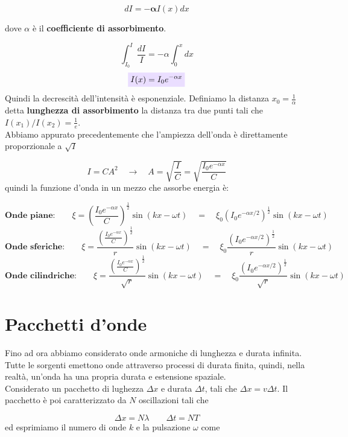 \documentclass[x11names]{report}
\newcommand{\viola}[1]{\colorbox{yred}{$\displaystyle #1$}}
\begin{document}
	\[ 
	dI = -\boldsymbol{\alpha} I(x)dx
	\]
	
	dove \(\alpha\) è il \textbf{coefficiente di assorbimento}.
	
	\[ 
	\int_{I_0}^{I} \frac{dI}{I} = -\alpha\int_{0}^{x} dx 
	\]
	\begin{equation}
		\viola{I(x) = I_0e^{-\alpha x}}
	\end{equation}
	Quindi la decrescità dell'intensità è esponenziale. Definiamo la distanza \(x_0 = \frac{1}{\alpha}\) detta \textbf{lunghezza di assorbimento} la distanza tra due punti tali che \(I(x_1)/I(x_2) = \frac{1}{e}\).\\
	
	\noindent
	Abbiamo appurato precedentemente che l'ampiezza dell'onda è direttamente proporzionale a \(\sqrt{I}\)
	
	\[ 
	I = CA^2 \quad \to \quad A = \sqrt{\frac{I}{C}} = \sqrt{\frac{I_0e^{-\alpha x}}{C}}
	\]
	quindi la funzione d'onda in un mezzo che assorbe energia è:
	
	\[ 
	\textbf{Onde piane:}\qquad \xi = \left(\frac{I_0e^{-\alpha x}}{C}\right)^{\frac{1}{2}} \sin\left(kx-\omega t\right) \quad = \quad \xi_0 \left(I_0e^{-\alpha x/2}\right)^{\frac{1}{2}}\sin\left(kx-\omega t\right)
	\]
	\[ 
	\textbf{Onde sferiche:}\qquad \xi = \frac{\left(\frac{I_0e^{-\alpha x}}{C}\right)^{\frac{1}{2}}}{r} \sin\left(kx-\omega t\right) \quad = \quad \xi_0 \frac{\left(I_0e^{-\alpha x/2}\right)^{\frac{1}{2}}}{r}\sin\left(kx-\omega t\right)
	\]
	\[ 
	\textbf{Onde cilindriche:}\qquad \xi = \frac{\left(\frac{I_0e^{-\alpha x}}{C}\right)^{\frac{1}{2}}}{\sqrt{r}} \sin\left(kx-\omega t\right) \quad = \quad \xi_0 \frac{\left(I_0e^{-\alpha x/2}\right)^{\frac{1}{2}}}{\sqrt{r}}\sin\left(kx-\omega t\right)
	\]
	
	\newpage
	\section{Pacchetti d'onde}
	Fino ad ora abbiamo considerato onde armoniche di lunghezza e durata infinita. Tutte le sorgenti emettono onde attraverso processi di durata finita, quindi, nella realtà, un'onda ha una propria durata e estensione spaziale.\\
	
	\noindent
	Considerato un pacchetto di lughezza \(\Delta x\) e durata \(\Delta t\), tali che \(\Delta x = v\Delta t\). Il pacchetto è poi caratterizzato da \(N\) oscillazioni tali che
	
	\[ 
	\Delta x  =N \lambda \qquad \Delta t = NT 
	\]
	ed esprimiamo il numero di onde \(k\) e la pulsazione \(\omega\) come
	
\end{document}
